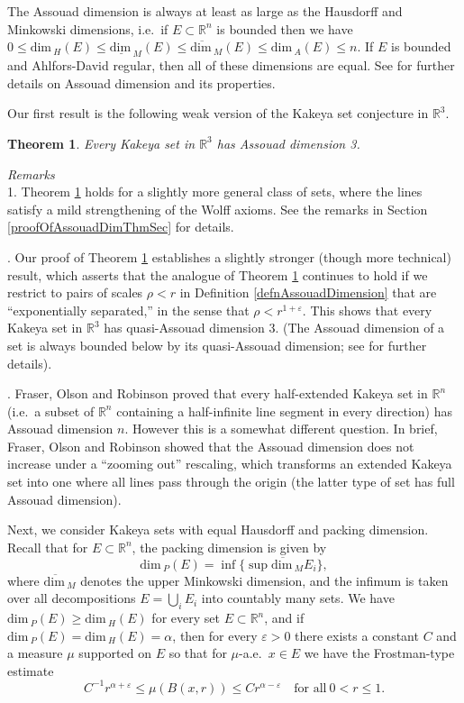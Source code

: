 \documentclass[letterpaper, reqno,11pt]{article}
\numberwithin{equation}{section}
\renewcommand{\dim}{\mathrm{dim}\,}
\newcommand{\RR}{\mathbb{R}}
\newcommand{\eps}{\varepsilon}
\newtheorem{thm}{Theorem}
\numberwithin{thm}{section}
\theoremstyle{remark}
\begin{document}
The Assouad dimension is always at least as large as the Hausdorff and Minkowski dimensions, i.e.~if $E\subset\RR^n$ is bounded then we have $0\leq \dim_{\!H}(E)\leq\underline{\dim}_M(E)\leq \overline{\dim}_M(E)\leq\dim_A(E)\leq n$. If $E$ is bounded and Ahlfors-David regular, then all of these dimensions are equal. See \cite{Fra} for further details on Assouad dimension and its properties. 

Our first result is the following weak version of the Kakeya set conjecture in $\RR^3$.

\begin{thm}\label{assouadDimThm}
Every Kakeya set in $\RR^3$ has Assouad dimension 3.
\end{thm}
\noindent\emph{Remarks}\\
1. Theorem \ref{assouadDimThm} holds for a slightly more general class of sets, where the lines satisfy a mild strengthening of the Wolff axioms. See the remarks in Section \ref{proofOfAssouadDimThmSec} for details.
\medskip

\medskip
{}. Our proof of Theorem \ref{assouadDimThm} establishes a slightly stronger (though more technical) result, which asserts that the analogue of Theorem \ref{assouadDimThm} continues to hold if we restrict to pairs of scales $\rho<r$ in Definition \ref{defnAssouadDimension} that are ``exponentially separated,'' in the sense that $\rho < r^{1+\eps}$. This shows that every Kakeya set in $\RR^3$ has quasi-Assouad dimension 3. (The Assouad dimension of a set is always bounded below by its quasi-Assouad dimension; see \cite{Fra} for further details).

\medskip
{}.
Fraser, Olson and Robinson \cite{FOR} proved that every half-extended Kakeya set in $\RR^n$ (i.e.~a subset of $\RR^n$ containing a half-infinite line segment in every direction) has Assouad dimension $n$. However this is a somewhat different question. In brief, Fraser, Olson and Robinson showed that the Assouad dimension does not increase under a ``zooming out'' rescaling, which transforms an extended Kakeya set into one where all lines pass through the origin (the latter type of set has full Assouad dimension).

\medskip

Next, we consider Kakeya sets with equal Hausdorff and packing dimension. Recall that for $E\subset\RR^n$, the packing dimension is given by 
\[
\dim_{\!P}(E)=\inf\{\sup \overline {\dim}_M E_i\},
\]
where $\overline{\dim}_M$ denotes the upper Minkowski dimension, and the infimum is taken over all decompositions $E=\bigcup_i E_i$ into countably many sets. We have $\dim_{\!P}(E)\geq\dim_{\!H}(E)$ for every set $E\subset\RR^n$, and if $\dim_{\!P}(E)=\dim_{\!H}(E)=\alpha $, then for every $\eps>0$ there exists a constant $C$ and a measure $\mu$ supported on $E$ so that for $\mu$-a.e.~$x\in E$ we have the Frostman-type estimate 
\[
C^{-1}r^{\alpha+\eps}\leq\mu(B(x,r))\leq C r^{\alpha-\eps}\quad\textrm{for all}\ 0<r\leq 1. 
\]
\end{document}
